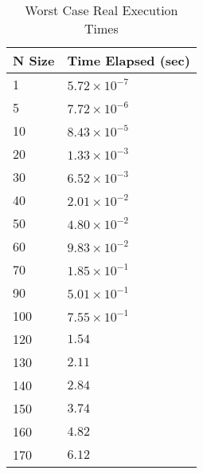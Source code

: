 \documentclass[11pt, oneside, a4paper]{article}
\begin{document}
	\begin{table}[H]
		\centering
		\begin{tabular}{|l|l|} \hline
			\textbf{N Size} & \textbf{Time Elapsed (sec)} \\ \hline
			1 & \( 5.72 \times 10^{-7}\) \\ \hline
			5 & \( 7.72 \times 10^{-6}\) \\ \hline
			10 & \( 8.43 \times 10^{-5}\) \\ \hline
			20 & \( 1.33 \times 10^{-3}\) \\ \hline
			30 & \( 6.52 \times 10^{-3}\) \\ \hline
			40 & \( 2.01 \times 10^{-2}\) \\ \hline
			50 & \( 4.80 \times 10^{-2}\) \\ \hline
			60 & \( 9.83 \times 10^{-2}\) \\ \hline
			70 & \( 1.85 \times 10^{-1}\) \\ \hline
			90 & \( 5.01 \times 10^{-1}\) \\ \hline
			100 & \( 7.55 \times 10^{-1}\) \\ \hline
			120 & \( 1.54 \) \\ \hline
			130 & \( 2.11 \) \\ \hline
			140 & \( 2.84 \) \\ \hline
			150 & \( 3.74 \) \\ \hline
			160 & \( 4.82 \) \\ \hline
			170 & \( 6.12 \) \\ \hline
		\end{tabular}
		\caption{Worst Case Real Execution Times}
		\label{tab:worst-case}
	\end{table}
\end{document}
